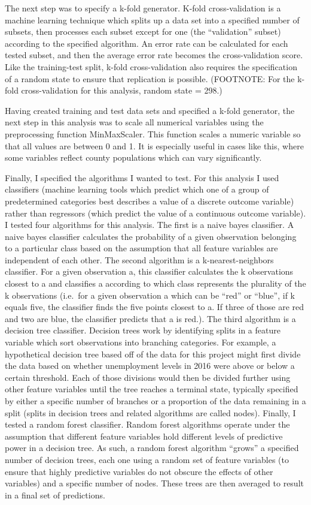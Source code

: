 \documentclass[11pt]{article}
\begin{document}
    The next step was to specify a k-fold generator. K-fold cross-validation
is a machine learning technique which splits up a data set into a
specified number of subsets, then processes each subset except for one
(the ``validation'' subset) according to the specified algorithm. An
error rate can be calculated for each tested subset, and then the
average error rate becomes the cross-validation score. Like the
training-test split, k-fold cross-validation also requires the
specification of a random state to ensure that replication is possible.
(FOOTNOTE: For the k-fold cross-validation for this analysis, random
state = 298.)

    Having created training and test data sets and specified a k-fold
generator, the next step in this analysis was to scale all numerical
variables using the preprocessing function MinMaxScaler. This function
scales a numeric variable so that all values are between 0 and 1. It is
especially useful in cases like this, where some variables reflect
county populations which can vary significantly.

    Finally, I specified the algorithms I wanted to test. For this analysis
I used classifiers (machine learning tools which predict which one of a
group of predetermined categories best describes a value of a discrete
outcome variable) rather than regressors (which predict the value of a
continuous outcome variable). I tested four algorithms for this
analysis. The first is a naive bayes classifier. A naive bayes
classifier calculates the probability of a given observation belonging
to a particular class based on the assumption that all feature variables
are independent of each other. The second algorithm is a
k-nearest-neighbors classifier. For a given observation a, this
classifier calculates the k observations closest to a and classifies a
according to which class represents the plurality of the k observations
(i.e.~for a given observation a which can be ``red'' or ``blue'', if k
equals five, the classifier finds the five points closest to a. If three
of those are red and two are blue, the classifier predicts that a is
red.). The third algorithm is a decision tree classifier. Decision trees
work by identifying splits in a feature variable which sort observations
into branching categories. For example, a hypothetical decision tree
based off of the data for this project might first divide the data based
on whether unemployment levels in 2016 were above or below a certain
threshold. Each of those divisions would then be divided further using
other feature variables until the tree reaches a terminal state,
typically specified by either a specific number of branches or a
proportion of the data remaining in a split (splits in decision trees
and related algorithms are called nodes). Finally, I tested a random
forest classifier. Random forest algorithms operate under the assumption
that different feature variables hold different levels of predictive
power in a decision tree. As such, a random forest algorithm ``grows'' a
specified number of decision trees, each one using a random set of
feature variables (to ensure that highly predictive variables do not
obscure the effects of other variables) and a specific number of nodes.
These trees are then averaged to result in a final set of predictions.
\end{document}

